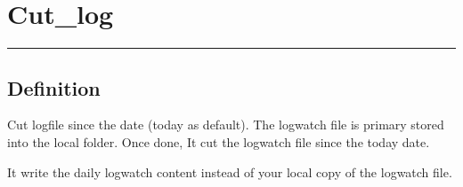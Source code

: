 \documentclass[letterpaper,10pt,english]{sphinxmanual}
\begin{document}
\sphinxstepscope

\newpage
\section{Cut\_log}
\label{\detokenize{OUP/Cut_log:cut-log}}\label{\detokenize{OUP/Cut_log::doc}}
\begin{sphinxVerbatim}[commandchars=\\\{\}]
 
\end{sphinxVerbatim}


\bigskip\hrule\bigskip



\subsection{Definition}
\label{\detokenize{OUP/Cut_log:definition}}
\sphinxAtStartPar
Cut logfile since the date (today as default).
The logwatch file is primary stored into the local folder.
Once done, It cut the logwatch file since the today date.

\sphinxAtStartPar
It write the daily logwatch content instead of your local copy of the logwatch file.
\end{document}
